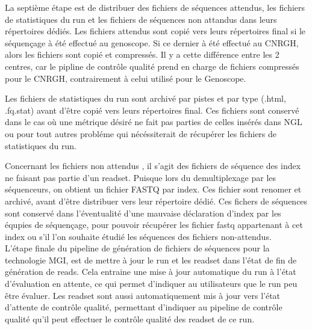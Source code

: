 La septième étape est de distribuer des fichiers de séquences \og attendus\fg{}, les fichiers de statistiques du run et les fichiers de séquences \og non attandus\fg{} dans leurs répertoires dédiés.
Les fichiers attendus sont copié vers leurs répertoires final si le séquençage à été effectué au genoscope.
Si ce dernier à été effectué au CNRGH, alors les fichiers sont copié et compressés.
Il y a cette différence entre les 2 centres, car le pipline de contrôle qualité prend en charge de fichiers compressés pour le CNRGH, contrairement à celui utilisé pour le Genoscope.

Les fichiers de statistiques du run sont archivé par pistes et par type (.html, .fq.stat) avant d'être copié vers leurs répertoires final.
Ces fichiers sont conservé dans le cas où une métrique désiré ne fait pas parties de celles insérés dans NGL ou pour tout autres probléme qui nécéssiterait de récupérer les fichiers de statistiques du run.

Concernant les fichiers \og non attendus \fg{}, il s'agit des fichiers de séquence des index ne faisant pas partie d'un readset. Puisque lors du demultiplexage par les séquenceurs, on obtient un fichier FASTQ par index.
Ces fichier sont renomer et archivé, avant d'être distribuer vers leur répertoire dédié.
Ces fichers de séquences sont conservé dans l'éventualité d'une mauvaise déclaration d'index par les équpies de séquençage, pour pouvoir récupérer les fichier fastq appartenant à cet index ou s'il l'on souhaite étudié les séquences des fichiers \og non-attendus\fg{}.\\

L'étape finale du pipeline de génération de fichiers de séquences pour la technologie MGI, est de mettre à jour le run et les readset dans l'état de \og fin de génération de reads\fg{}.
Cela entraine une mise à jour automatique du run à l'état \og d'évaluation en attente\fg{}, ce qui permet d'indiquer au utilisateurs que le run peu être évaluer.
Les readset sont aussi automatiquement mis à jour vers l'état \og d'attente de contrôle qualité\fg{}, permettant d'indiquer au pipeline de contrôle qualité qu'il peut effectuer le contrôle qualité des readset de ce run.

